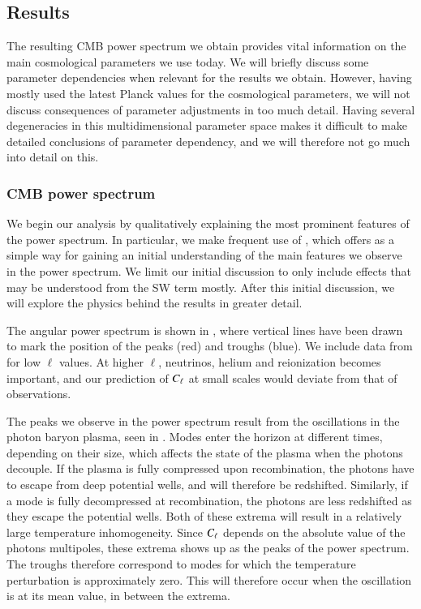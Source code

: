 \subsection{Results}\label{ssec:M4:results}
The resulting CMB power spectrum we obtain provides vital information on the main cosmological parameters we use today. We will briefly discuss some parameter dependencies when relevant for the results we obtain. However, having mostly used the latest Planck values for the cosmological parameters, we will not discuss consequences of parameter adjustments in too much detail. Having several degeneracies in this multidimensional parameter space makes it difficult to make detailed conclusions of parameter dependency, and we will therefore not go much into detail on this.  

\subsubsection{CMB power spectrum} \label{sssec:M4:results:angular_power_spectrum}
We begin our analysis by qualitatively explaining the most prominent features of the power spectrum. In particular, we make frequent use of , which offers as a simple way for gaining an initial understanding of the main features we observe in the power spectrum. We limit our initial discussion to only include effects that may be understood from the SW term mostly. After this initial discussion, we will explore the physics behind the results in greater detail.

The angular power spectrum is shown in , where vertical lines have been drawn to mark the position of the peaks (red) and troughs (blue). We include data from \cite{Planck2020} for low $\ell$ values. At higher $\ell$, neutrinos, helium and reionization becomes important, and our prediction of $C_\ell$ at small scales would deviate from that of observations. 

The peaks we observe in the power spectrum result from the oscillations in the photon baryon plasma, seen in . Modes enter the horizon at different times, depending on their size, which affects the state of the plasma when the photons decouple. If the plasma is fully compressed upon recombination, the photons have to escape from deep potential wells, and will therefore be redshifted. Similarly, if a mode is fully decompressed at recombination, the photons are less redshifted as they escape the potential wells. Both of these extrema will result in a relatively large temperature inhomogeneity. Since $C_\ell$ depends on the absolute value of the photons multipoles, these extrema shows up as the peaks of the power spectrum. The troughs therefore correspond to modes for which the temperature perturbation is approximately zero. This will therefore occur when the oscillation is at its mean value, in between the extrema.     

